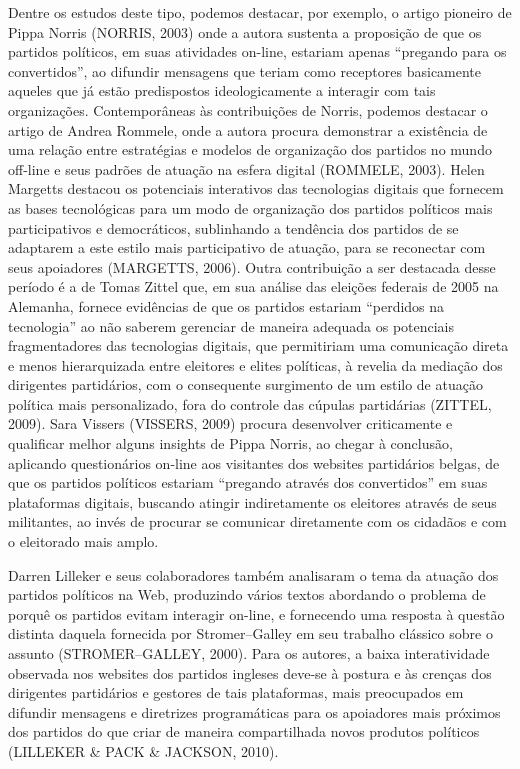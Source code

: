 Dentre os estudos deste tipo, podemos destacar, por exemplo, o artigo
pioneiro de Pippa Norris (NORRIS, 2003) onde a autora sustenta a
proposição de que os partidos políticos, em suas atividades on-line,
estariam apenas ``pregando para os convertidos'', ao difundir mensagens
que teriam como receptores basicamente aqueles que já estão predispostos
ideologicamente a interagir com tais organizações. Contemporâneas às
contribuições de Norris, podemos destacar o artigo de Andrea Rommele,
onde a autora procura demonstrar a existência de uma relação entre
estratégias e modelos de organização dos partidos no mundo off-line e
seus padrões de atuação na esfera digital (ROMMELE, 2003). Helen
Margetts destacou os potenciais interativos das tecnologias digitais que
fornecem as bases tecnológicas para um modo de organização dos partidos
políticos mais participativos e democráticos, sublinhando a tendência
dos partidos de se adaptarem a este estilo mais participativo de
atuação, para se reconectar com seus apoiadores (MARGETTS, 2006). Outra
contribuição a ser destacada desse período é a de Tomas Zittel que, em
sua análise das eleições federais de 2005 na Alemanha, fornece
evidências de que os partidos estariam ``perdidos na tecnologia'' ao não
saberem gerenciar de maneira adequada os potenciais fragmentadores das
tecnologias digitais, que permitiriam uma comunicação direta e menos
hierarquizada entre eleitores e elites políticas, à revelia da mediação
dos dirigentes partidários, com o consequente surgimento de um estilo de
atuação política mais personalizado, fora do controle das cúpulas
partidárias (ZITTEL, 2009). Sara Vissers (VISSERS, 2009) procura
desenvolver criticamente e qualificar melhor alguns insights de Pippa
Norris, ao chegar à conclusão, aplicando questionários on-line aos
visitantes dos websites partidários belgas, de que os partidos políticos
estariam ``pregando através dos convertidos'' em suas plataformas
digitais, buscando atingir indiretamente os eleitores através de seus
militantes, ao invés de procurar se comunicar diretamente com os
cidadãos e com o eleitorado mais amplo.

Darren Lilleker e seus colaboradores também analisaram o tema da atuação
dos partidos políticos na Web, produzindo vários textos abordando o
problema de porquê os partidos evitam interagir on-line, e fornecendo
uma resposta à questão distinta daquela fornecida por Stromer--Galley em
seu trabalho clássico sobre o assunto (STROMER--GALLEY, 2000). Para os
autores, a baixa interatividade observada nos websites dos partidos
ingleses deve-se à postura e às crenças dos dirigentes partidários e
gestores de tais plataformas, mais preocupados em difundir mensagens e
diretrizes programáticas para os apoiadores mais próximos dos partidos
do que criar de maneira compartilhada novos produtos políticos (LILLEKER
\& PACK \& JACKSON, 2010).

